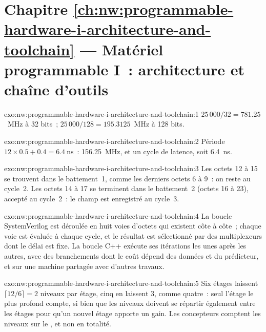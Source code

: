 \section*{Chapitre \ref{ch:nw:programmable-hardware-i-architecture-and-toolchain} --- Matériel programmable I~: architecture et chaîne d'outils}

\begin{solution}{exo:nw:programmable-hardware-i-architecture-and-toolchain:1}
$25\,000/32 = 781.25$~MHz à 32 bits~; $25\,000/128 = 195.3125$~MHz à 128 bits.
\end{solution}

\begin{solution}{exo:nw:programmable-hardware-i-architecture-and-toolchain:2}
Période $12 \times 0.5 + 0.4 = \qty{6.4}{\nano\second}$~: 156.25~MHz, et un cycle de latence, soit \qty{6.4}{\nano\second}.
\end{solution}

\begin{solution}{exo:nw:programmable-hardware-i-architecture-and-toolchain:3}
Les octets 12 à 15 se trouvent dans le battement~1, comme les derniers octets 6 à 9~: on reste au cycle~2. Les octets 14 à 17 se terminent dans le battement~2 (octets 16 à 23), accepté au
cycle~2~: le champ est enregistré au cycle~3.
\end{solution}

\begin{solution}{exo:nw:programmable-hardware-i-architecture-and-toolchain:4}
La boucle SystemVerilog est déroulée en huit voies d'octets qui existent côte à côte~; chaque voie est évaluée à chaque cycle, et le résultat est
sélectionné par des multiplexeurs dont le délai est fixe. La boucle C++ exécute ses itérations les unes après les autres, avec des branchements dont le coût dépend des
données et du prédicteur, et sur une machine partagée avec d'autres travaux.
\end{solution}

\begin{solution}{exo:nw:programmable-hardware-i-architecture-and-toolchain:5}
Six étages laissent $\lceil 12/6\rceil = 2$ niveaux par étage, cinq en laissent 3, comme quatre~: seul l'étage le plus profond compte, si bien que les niveaux doivent
se répartir également entre les étages pour qu'un nouvel étage apporte un gain. Les concepteurs comptent les niveaux sur le , et non en totalité.
\end{solution}

